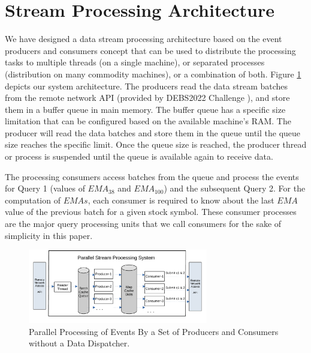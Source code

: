 \section{Stream Processing Architecture}\label{sec:concepts}
We have designed a data stream processing architecture based on the event producers and consumers concept that can be used to distribute the processing tasks to multiple threads (on a single machine), or separated processes (distribution on many commodity machines), or a combination of both.
Figure \ref{fig:parallel-srream-processing1} depicts our system architecture. The producers read the data stream batches from the remote network API (provided by DEBS2022 Challenge \cite{debs2022challenge}), and store them in a buffer queue in main memory.
The buffer queue has a specific size limitation that can be configured based on the available machine's RAM. The producer will read the data batches and store them in the queue until the queue size reaches the specific limit. Once the queue size is reached, the producer thread or process is suspended until the queue is available again to receive data.

The processing consumers access batches from the queue and process the events for Query 1 (values of $EMA_{38}$ and $EMA_{100}$)
and the subsequent Query 2. For the computation of $EMAs$, each consumer is required to know about the last $EMA$ value of the previous batch for a given stock symbol.
These consumer processes are the major query processing units that we call consumers for the sake of simplicity in this paper.

\begin{figure}[!ht]
    \begin{center}
        \includegraphics[width=0.7\textwidth]{./images/Parallel-Stream-Processing-System_v2}
        \caption{Parallel Processing of Events By a Set of Producers and Consumers without a Data Dispatcher.}
        \label{fig:parallel-srream-processing1}
    \end{center}
\end{figure}

